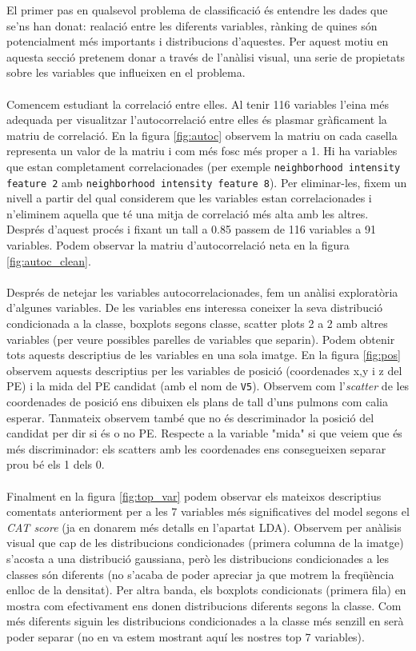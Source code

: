 \documentclass[a4paper,10pt]{article}
\begin{document}
El primer pas en qualsevol problema de classificació és entendre les dades que se'ns han donat: realació entre les diferents variables, rànking de quines són potencialment més importants i distribucions d'aquestes. Per aquest motiu en aquesta secció pretenem donar a través de l'anàlisi visual, una serie de propietats sobre les variables que influeixen en el problema.
\\
\\
Comencem estudiant la correlació entre elles. Al tenir 116 variables l'eina més adequada per visualitzar l'autocorrelació entre elles és plasmar gràficament la matriu de correlació. En la figura \ref{fig:autoc} observem la matriu on cada casella representa un valor de la matriu i com més fosc més proper a 1. Hi ha variables que estan completament correlacionades (per exemple \texttt{neighborhood intensity feature 2} amb \texttt{neighborhood intensity feature 8}). Per eliminar-les, fixem un nivell a partir del qual considerem que les variables estan correlacionades i n'eliminem aquella que té una mitja de correlació més alta amb les altres. Després d'aquest procés i fixant un tall a 0.85 passem de 116 variables a 91 variables. Podem observar la matriu d'autocorrelació neta en la figura \ref{fig:autoc_clean}.
\\
\\
Després de netejar les variables autocorrelacionades, fem un anàlisi exploratòria d'algunes variables. De les variables ens interessa coneixer la seva distribució condicionada a la classe, boxplots segons classe, scatter plots 2 a 2 amb altres variables (per veure possibles parelles de variables que separin). Podem obtenir tots aquests descriptius de les variables en una sola imatge. En la figura \ref{fig:pos} observem aquests descriptius per les variables de posició (coordenades x,y i z del PE) i la mida del PE candidat (amb el nom de \texttt{V5}). Observem com l'\textit{scatter} de les coordenades de posició ens dibuixen els plans de tall d'uns pulmons com calia esperar. Tanmateix observem també que no és descriminador la posició del candidat per dir si és o no PE. Respecte a la variable "mida" si que veiem que és més discriminador: els scatters amb les coordenades ens consegueixen separar prou bé els 1 dels 0. 
\\
\\
Finalment en la figura \ref{fig:top_var} podem observar els mateixos descriptius comentats anteriorment per a les 7 variables més significatives del model segons el \textit{CAT score} (ja en donarem més detalls en l'apartat LDA). Observem per anàlisis visual que cap de les distribucions condicionades (primera columna de la imatge) s'acosta a una distribució gaussiana, però les distribucions condicionades a les classes són diferents (no s'acaba de poder apreciar ja que motrem la freqüència enlloc de la densitat). Per altra banda, els boxplots condicionats (primera fila) en mostra com efectivament ens donen distribucions diferents segons la classe. Com més diferents siguin les distribucions condicionades a la classe més senzill en serà poder separar (no en va estem mostrant aquí les nostres top 7 variables). 
\end{document}

